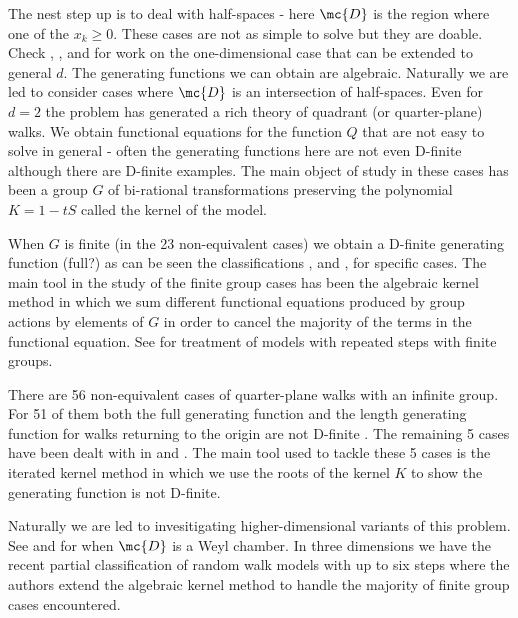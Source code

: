 The nest step up is to deal with half-spaces - here $\mc{D}$ is the region where one of the $x_k \ge 0$. These cases are not as simple to solve but they are doable. Check \cite{gessel1980factorization}, \cite{bousquet2000linear}, \cite{duchon2000enumeration} and \cite{banderier2002basic} for work on the one-dimensional case that can be extended to general $d$. The generating functions we can obtain are algebraic. Naturally we are led to consider cases where $\mc{D}$ is an intersection of half-spaces. Even for $d=2$ the problem has generated a rich theory of quadrant (or quarter-plane) walks. We obtain functional equations for the function $Q$ that are not easy to solve in general - often the generating functions here are not even D-finite although there are D-finite examples. The main object of study in these cases has been a group $G$ of bi-rational transformations preserving the polynomial $K = 1- tS$ called the kernel of the model. 

When $G$ is finite (in the 23 non-equivalent cases) we obtain a D-finite generating function (full?) as can be seen the classifications \cite{mishna2009classifying},\cite{bousquet2010walks} and \cite{bousquet2005walks}, \cite{bostan2010complete} for specific cases. The main tool in the study of the finite group cases has been the algebraic kernel method in which we sum different functional equations produced by group actions by elements of $G$ in order to cancel the majority of the terms in the functional equation. See \cite{kauers2014walks} for treatment of models with repeated steps with finite groups.

 There are 56 non-equivalent cases of quarter-plane walks with an infinite group. For 51 of them both the full generating function \cite{kurkova2011explicit} and the length generating function for walks returning to the origin are not D-finite \cite{bostan2014non}. The remaining 5 cases have been dealt with in \cite{melczer2014singularity} and \cite{melczer2014variants}. The main tool used to tackle these 5 cases is the iterated kernel method in which we use the roots of the kernel $K$ to show the generating function is not D-finite.

Naturally we are led to invesitigating higher-dimensional variants of this problem. See \cite{gessel1992random} and \cite{grabiner1993random} for when $\mc{D}$ is a Weyl chamber. In three dimensions we have the recent partial classification \cite{bostan2014three} of random walk models with up to six steps where the authors extend the algebraic kernel method to handle the majority of finite group cases encountered.

